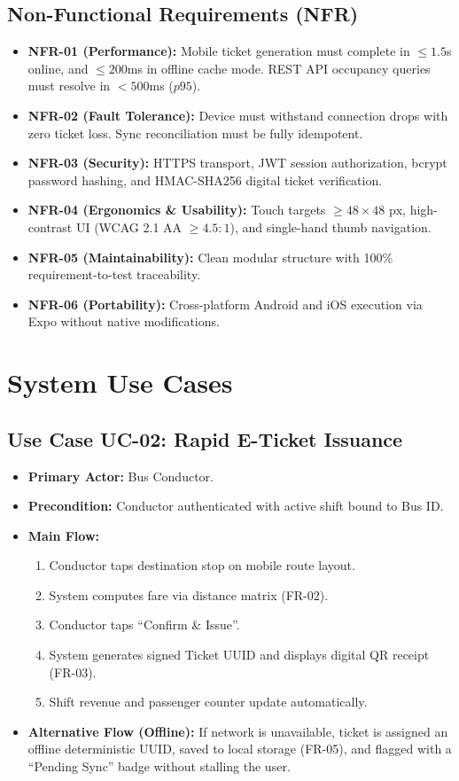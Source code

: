 \documentclass[11pt,a4paper]{article}
\begin{document}
\subsection{Non-Functional Requirements (NFR)}
\begin{itemize}
    \item \textbf{NFR-01 (Performance):} Mobile ticket generation must complete in $\le 1.5$s online, and $\le 200$ms in offline cache mode. REST API occupancy queries must resolve in $< 500$ms ($p95$).
    \item \textbf{NFR-02 (Fault Tolerance):} Device must withstand connection drops with zero ticket loss. Sync reconciliation must be fully idempotent.
    \item \textbf{NFR-03 (Security):} HTTPS transport, JWT session authorization, bcrypt password hashing, and HMAC-SHA256 digital ticket verification.
    \item \textbf{NFR-04 (Ergonomics \& Usability):} Touch targets $\ge 48 \times 48\text{ px}$, high-contrast UI (WCAG 2.1 AA $\ge 4.5:1$), and single-hand thumb navigation.
    \item \textbf{NFR-05 (Maintainability):} Clean modular structure with 100\% requirement-to-test traceability.
    \item \textbf{NFR-06 (Portability):} Cross-platform Android and iOS execution via Expo without native modifications.
\end{itemize}

\section{System Use Cases}

\subsection{Use Case UC-02: Rapid E-Ticket Issuance}
\begin{itemize}[noitemsep]
    \item \textbf{Primary Actor:} Bus Conductor.
    \item \textbf{Precondition:} Conductor authenticated with active shift bound to Bus ID.
    \item \textbf{Main Flow:}
    \begin{enumerate}[noitemsep]
        \item Conductor taps destination stop on mobile route layout.
        \item System computes fare via distance matrix (FR-02).
        \item Conductor taps ``Confirm \& Issue''.
        \item System generates signed Ticket UUID and displays digital QR receipt (FR-03).
        \item Shift revenue and passenger counter update automatically.
    \end{enumerate}
    \item \textbf{Alternative Flow (Offline):} If network is unavailable, ticket is assigned an offline deterministic UUID, saved to local storage (FR-05), and flagged with a ``Pending Sync'' badge without stalling the user.
\end{itemize}
\end{document}
